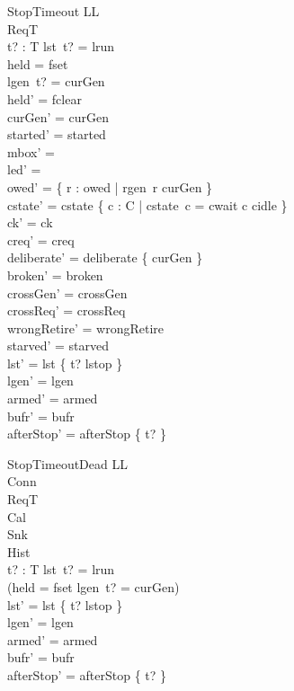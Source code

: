 \documentclass[a4paper,10pt,fleqn]{article}
\begin{document}
\begin{schema}{StopTimeout}
  \Delta LL \\
  \Xi ReqT \\
  t? : T
\where
  lst~t? = lrun \\
  held = fset \\
  lgen~t? = curGen \\
  held' = fclear \\
  curGen' = curGen \\
  started' = started \\
  mbox' = \emptyset \\
  led' = \emptyset \\
  owed' = \{ r : owed | rgen~r \neq curGen \} \\
  cstate' = cstate \oplus \{ c : C | cstate~c = cwait \spot c \mapsto cidle \} \\
  ck' = ck \\
  creq' = creq \\
  deliberate' = deliberate \cup \{ curGen \} \\
  broken' = broken \\
  crossGen' = crossGen \\
  crossReq' = crossReq \\
  wrongRetire' = wrongRetire \\
  starved' = starved \\
  lst' = lst \oplus \{ t? \mapsto lstop \} \\
  lgen' = lgen \\
  armed' = armed \\
  bufr' = bufr \\
  afterStop' = afterStop \oplus \{ t?  \}
\end{schema}

\begin{schema}{StopTimeoutDead}
  \Delta LL \\
  \Xi Conn \\
  \Xi ReqT \\
  \Xi Cal \\
  \Xi Snk \\
  \Xi Hist \\
  t? : T
\where
  lst~t? = lrun \\
  \lnot (held = fset \land lgen~t? = curGen) \\
  lst' = lst \oplus \{ t? \mapsto lstop \} \\
  lgen' = lgen \\
  armed' = armed \\
  bufr' = bufr \\
  afterStop' = afterStop \oplus \{ t?  \}
\end{schema}
\end{document}
